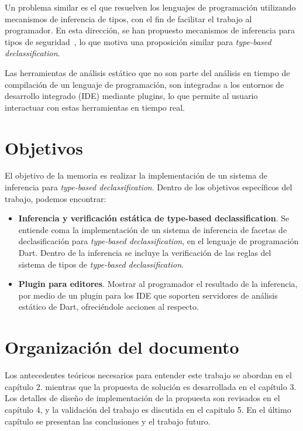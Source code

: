 \begin{intro}
	Un problema similar es el que resuelven los lenguajes de programación utilizando mecanismos de inferencia de tipos, con el fin de facilitar el trabajo al programador. En esta dirección, se han propuesto mecanismos de inferencia para tipos de seguridad~\cite{Pottier}, lo que motiva una proposición similar para \textit{type-based declassification}.

	Las herramientas de análisis estático que no son parte del análisis en tiempo de compilación de un lenguaje de programación, son integradas a los entornos de desarrollo integrado (IDE) mediante plugins, lo que permite al usuario interactuar con estas herramientas en tiempo real.

	\section{Objetivos}
	El objetivo de la memoria es realizar la implementación de un sistema de inferencia para \textit{type-based declassification}. Dentro de los objetivos específicos del trabajo, podemos encontrar:

	\begin{itemize}
	\item \textbf{Inferencia y verificación estática de type-based declassification}. Se entiende coma la implementación de un sistema de inferencia de facetas de declasificación para \textit{type-based declassification}, en el lenguaje de programación Dart. Dentro de la inferencia se incluye la verificación de las reglas del sistema de tipos de \textit{type-based declassification}.

	\item \textbf{Plugin para editores}. Mostrar al programador el resultado de la inferencia, por medio de un plugin para los IDE que soporten servidores de análisis estático de Dart, ofreciéndole acciones al respecto.

	\end{itemize}

	\section{Organización del documento}

	Los antecedentes teóricos necesarios para entender este trabajo se abordan en el capítulo 2. mientras que la propuesta de solución es desarrollada en el capítulo 3. Los detalles de diseño de implementación de la propuesta son revisados en el capítulo 4, y la validación del trabajo es discutida en el capitulo 5. En el último capítulo se presentan las conclusiones y el trabajo futuro.

\end{intro}
